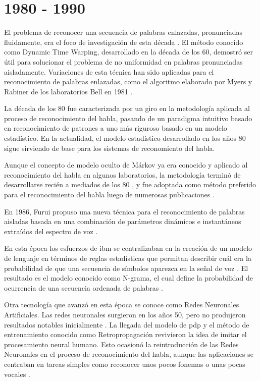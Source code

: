 \section{1980 - 1990}
\label{sec:80s}

El problema de reconocer una secuencia de palabras enlazadas, pronunciadas fluidamente, era el foco
de investigaci\'{o}n de esta d\'{e}cada \cite{Furui50Years2004}. El m\'{e}todo conocido como 
Dynamic Time Warping, desarrollado en la d\'{e}cada de los 60, demostr\'{o} ser \'{u}til para solucionar el problema de no uniformidad
en palabras pronunciadas aisladamente. Variaciones de esta t\'{e}cnica han sido aplicadas para el 
reconocimiento de palabras enlazadas, como el algoritmo elaborado por Myers y Rabiner de los laboratorios Bell
en 1981 \cite{MyersALevel1981}.

La d\'{e}cada de los 80 fue caracterizada por un giro en la metodolog\'{i}a aplicada al proceso de
reconocimiento del habla, pasando de un paradigma intuitivo basado en reconocimiento de patrones 
a uno m\'{a}s riguroso basado en un modelo estad\'{i}stico. En la actualidad, el modelo estad\'{i}stico
desarrollado en los a\~{n}os 80 sigue sirviendo de base para los sistemas de reconomiento del habla.

Aunque el concepto de modelo oculto de M\'{a}rkov ya era conocido y aplicado al reconocimiento del habla 
en algunos laboratorios, la metodolog\'{i}a termin\'{o} de desarrollarse reci\'{e}n a mediados 
de los 80 \cite{JuangAutomaticSpeech}, y fue adoptada como m\'{e}todo preferido para el reconocimiento 
del habla luego de numerosas publicaciones \cite{LevinsonAnIntroduction1983, FergusonHidden1980}.

En 1986, Furui propuso una nueva t\'{e}cnica para el reconocimiento de palabras aisladas basada en
una combinaci\'{o}n de par\'{a}metros din\'{a}micos e instant\'{a}neos 
extra\'{i}dos del espectro de voz \cite{FuruiSpeaker1986}.

En esta \'{e}poca los esfuerzos de \gls{ibm} se centralizaban en la creaci\'{o}n de un modelo de lenguaje en t\'{e}rminos de
reglas estad\'{i}sticas que permitan describir cu\'{a}l era la probabilidad de que una 
secuencia de s\'{i}mbolos aparezca en la se\~{n}al de voz \cite{Furui50Years2004}. El resultado es el
modelo conocido como N-grama, el cual define la probabilidad de ocurrencia de una secuencia ordenada
de palabras \cite{JelinekTheDevelopment1986}.

Otra tecnolog\'{i}a que avanz\'{o} en esta \'{e}poca se conoce como Redes Neuronales Artificiales. Las 
redes neuronales surgieron en los a\~{n}os 50, pero no produjeron resultados notables 
inicialmente \cite{JuangAutomaticSpeech}. La llegada del modelo de \gls{pdp} y el m\'{e}todo de entrenamiento conocido como Retropropagaci\'{o}n
revivieron la idea de imitar el procesamiento neural humano. Esto ocasion\'{o} la reintroducci\'{o}n de
las Redes Neuronales en el proceso de reconocimiento del habla, aunque las aplicaciones se centraban en tareas simples
como reconocer unos pocos fonemas o unas pocas vocales \cite{JuangAutomaticSpeech}.

